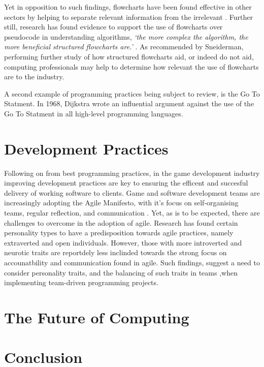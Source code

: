 \documentclass{scrartcl}
\begin{document}
Yet in opposition to such findings, flowcharts have been found effective in other sectors by helping to separate relevant information from the irrelevant \cite{Kammann1975}. Further still, research has found evidence to support the use of flowcharts over pseudocode in understanding algorithms, \textit{‘the more complex the algorithm, the more beneficial structured flowcharts are.’} \cite{Scanlan}. As recommended by Sneiderman, performing further study of how structured flowcharts aid, or indeed do not aid, computing professionals may help to determine how relevant the use of flowcharts are to the industry.

A second example of programming practices being subject to review, is the Go To Statment. In 1968, Dijkstra wrote an influential argument against the use of the Go To Statment in all high-level programming languages. 

\section{Development Practices}

Following on from best programming practices, in the game development industry improving development practices are key to ensuring the efficent and succesful delivery of working software to clients. Game and software development teams are increasingly adopting the Agile Manifesto, with it's focus on self-organising teams, regular reflection, and communication \cite{Agile}. Yet, as is to be expected, there are challenges to overcome in the adoption of agile. Research has found certain personality types to have a predisposition towards agile practices, namely extraverted and open individuals\cite{BishopDeokar}. However, those with more introverted and neurotic traits are reportdely less inclinded towards the strong focus on accounatbility and communication found in agile. Such findings, suggest a need to consider personality traits, and the balancing of such traits in teams ,when implementing team-driven programming projects.


\section{The Future of Computing}


\section{Conclusion}





\end{document}
